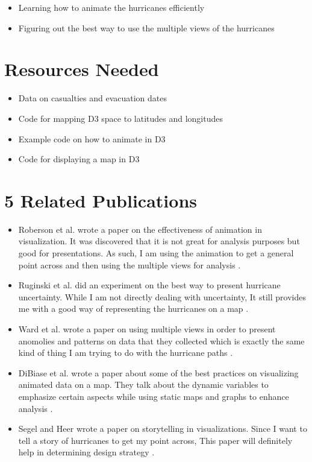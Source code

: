 \documentclass{proc}
\begin{document}
\begin{itemize}
\item Learning how to animate the hurricanes efficiently
\item Figuring out the best way to use the multiple views of the hurricanes
\end{itemize}

\section{Resources Needed}

\begin{itemize}
\item Data on casualties and evacuation dates
\item Code for mapping D3 space to latitudes and longitudes
\item Example code on how to animate in D3
\item Code for displaying a map in D3
\end{itemize}

\section{5 Related Publications}

\begin{itemize}
\item Roberson et al. wrote a paper on the effectiveness of animation in visualization. It was discovered that it is not great for analysis purposes but good for presentations. As such, I am using the animation to get a general point across and then using the multiple views for analysis \cite{robertson2008effectiveness}.
\item Ruginski et al. did an experiment on the best way to present hurricane uncertainty. While I am not directly dealing with uncertainty, It still provides me with a good way of representing the hurricanes on a map \cite{ruginski2016non}.
\item Ward et al. wrote a paper on using multiple views in order to present anomolies and patterns on data that they collected which is exactly the same kind of thing I am trying to do with the hurricane paths \cite{ward1994xmdvtool}.
\item DiBiase et al. wrote a paper about some of the best practices on visualizing animated data on a map. They talk about the dynamic variables to emphasize certain aspects while using static maps and graphs to enhance analysis \cite{dibiase1992animation}.
\item Segel and Heer wrote a paper on storytelling in visualizations. Since I want to tell a story of hurricanes to get my point across, This paper will definitely help in determining design strategy \cite{segel2010narrative}.
\end{itemize}
\end{document}
